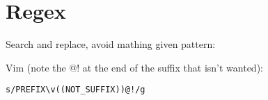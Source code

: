 \section{Regex}

Search and replace, avoid mathing given pattern:

Vim (note the @! at the end of the suffix that isn't wanted):
\begin{verbatim}s/PREFIX\v((NOT_SUFFIX))@!/g
\end{verbatim}
